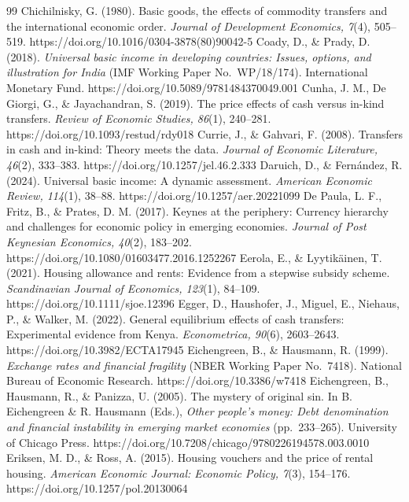 \documentclass[preprint,review,12pt]{elsarticle}
\begin{document}
\begin{thebibliography}{99}
 Chichilnisky, G. (1980). Basic goods, the effects of commodity transfers and the international economic order. \emph{Journal of Development Economics, 7}(4), 505--519. https://doi.org/10.1016/0304-3878(80)90042-5 
 Coady, D., \& Prady, D. (2018). \emph{Universal basic income in developing countries: Issues, options, and illustration for India} (IMF Working Paper No.~WP/18/174). International Monetary Fund. https://doi.org/10.5089/9781484370049.001 
 Cunha, J. M., De Giorgi, G., \& Jayachandran, S. (2019). The price effects of cash versus in-kind transfers. \emph{Review of Economic Studies, 86}(1), 240--281. https://doi.org/10.1093/restud/rdy018 
 Currie, J., \& Gahvari, F. (2008). Transfers in cash and in-kind: Theory meets the data. \emph{Journal of Economic Literature, 46}(2), 333--383. https://doi.org/10.1257/jel.46.2.333 
 Daruich, D., \& Fernández, R. (2024). Universal basic income: A dynamic assessment. \emph{American Economic Review, 114}(1), 38--88. https://doi.org/10.1257/aer.20221099 
 De Paula, L. F., Fritz, B., \& Prates, D. M. (2017). Keynes at the periphery: Currency hierarchy and challenges for economic policy in emerging economies. \emph{Journal of Post Keynesian Economics, 40}(2), 183--202. https://doi.org/10.1080/01603477.2016.1252267 
 Eerola, E., \& Lyytikäinen, T. (2021). Housing allowance and rents: Evidence from a stepwise subsidy scheme. \emph{Scandinavian Journal of Economics, 123}(1), 84--109. https://doi.org/10.1111/sjoe.12396 
 Egger, D., Haushofer, J., Miguel, E., Niehaus, P., \& Walker, M. (2022). General equilibrium effects of cash transfers: Experimental evidence from Kenya. \emph{Econometrica, 90}(6), 2603--2643. https://doi.org/10.3982/ECTA17945 
 Eichengreen, B., \& Hausmann, R. (1999). \emph{Exchange rates and financial fragility} (NBER Working Paper No.~7418). National Bureau of Economic Research. https://doi.org/10.3386/w7418 
 Eichengreen, B., Hausmann, R., \& Panizza, U. (2005). The mystery of original sin. In B. Eichengreen \& R. Hausmann (Eds.), \emph{Other people's money: Debt denomination and financial instability in emerging market economies} (pp.~233--265). University of Chicago Press. https://doi.org/10.7208/chicago/9780226194578.003.0010 
 Eriksen, M. D., \& Ross, A. (2015). Housing vouchers and the price of rental housing. \emph{American Economic Journal: Economic Policy, 7}(3), 154--176. https://doi.org/10.1257/pol.20130064 

\end{thebibliography}
\end{document}
